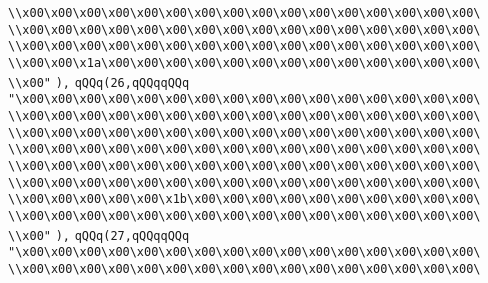 \verb|\\x00\x00\x00\x00\x00\x00\x00\x00\x00\x00\x00\x00\x00\x00\x00\x00\|\newline
\verb|\\x00\x00\x00\x00\x00\x00\x00\x00\x00\x00\x00\x00\x00\x00\x00\x00\|\newline
\verb|\\x00\x00\x00\x00\x00\x00\x00\x00\x00\x00\x00\x00\x00\x00\x00\x00\|\newline
\verb|\\x00\x00\x1a\x00\x00\x00\x00\x00\x00\x00\x00\x00\x00\x00\x00\x00\|\newline
\verb|\\x00"|\newline
\verb|),|\newline
\verb|qQQq(26,qQQqqQQq|\newline
\verb|"\x00\x00\x00\x00\x00\x00\x00\x00\x00\x00\x00\x00\x00\x00\x00\x00\|\newline
\verb|\\x00\x00\x00\x00\x00\x00\x00\x00\x00\x00\x00\x00\x00\x00\x00\x00\|\newline
\verb|\\x00\x00\x00\x00\x00\x00\x00\x00\x00\x00\x00\x00\x00\x00\x00\x00\|\newline
\verb|\\x00\x00\x00\x00\x00\x00\x00\x00\x00\x00\x00\x00\x00\x00\x00\x00\|\newline
\verb|\\x00\x00\x00\x00\x00\x00\x00\x00\x00\x00\x00\x00\x00\x00\x00\x00\|\newline
\verb|\\x00\x00\x00\x00\x00\x00\x00\x00\x00\x00\x00\x00\x00\x00\x00\x00\|\newline
\verb|\\x00\x00\x00\x00\x00\x1b\x00\x00\x00\x00\x00\x00\x00\x00\x00\x00\|\newline
\verb|\\x00\x00\x00\x00\x00\x00\x00\x00\x00\x00\x00\x00\x00\x00\x00\x00\|\newline
\verb|\\x00"|\newline
\verb|),|\newline
\verb|qQQq(27,qQQqqQQq|\newline
\verb|"\x00\x00\x00\x00\x00\x00\x00\x00\x00\x00\x00\x00\x00\x00\x00\x00\|\newline
\verb|\\x00\x00\x00\x00\x00\x00\x00\x00\x00\x00\x00\x00\x00\x00\x00\x00\|\newline
